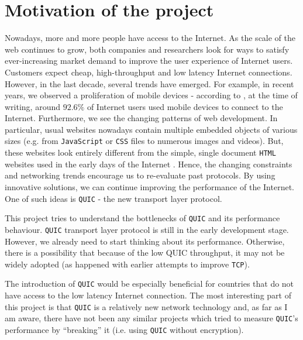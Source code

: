\documentclass[12pt,a4paper,twoside,openright]{report}
\begin{document}
\section{Motivation of the project}
Nowadays, more and more people have access to the Internet.
As the scale of the web continues to grow, both companies and researchers look for ways to satisfy ever-increasing market demand to improve the user experience of Internet users.
Customers expect cheap, high-throughput and low latency Internet connections.
However, in the last decade, several trends have emerged.
For example, in recent years, we observed a proliferation of mobile devices - according to \cite{bib_number_of_mobile_users}, at the time of writing, around $92.6\%$ of Internet users used mobile devices to connect to the Internet.
Furthermore, we see the changing patterns of web development.
In particular, usual websites nowadays contain multiple embedded objects of various sizes (e.g. from \texttt{JavaScript} or \texttt{CSS} files to numerous images and videos)\cite{bib_Netdev_0x13_QUIC_Tutorial}.
But, these websites look entirely different from the simple, single document \texttt{HTML} websites used in the early days of the Internet \cite{RudmanRiaan2016DW3o}.
Hence, the changing constraints and networking trends encourage us to re-evaluate past protocols.
By using innovative solutions, we can continue improving the performance of the Internet. 
One of such ideas is \texttt{QUIC} - the new transport layer protocol.



This project tries to understand the bottlenecks of \texttt{QUIC} and its performance behaviour.
\texttt{QUIC} transport layer protocol is still in the early development stage.
However, we already need to start thinking about its performance.
Otherwise, there is a possibility that because of the low QUIC throughput, it may not be widely adopted (as happened with earlier attempts to improve \texttt{TCP}). 


The introduction of \texttt{QUIC} would be especially beneficial for countries that do not have access to the low latency Internet connection.
The most interesting part of this project is that  \texttt{QUIC} is a relatively new network technology and, as far as I am aware, there have not been any similar projects which tried to measure \texttt{QUIC}’s performance by \enquote{breaking} it (i.e. using \texttt{QUIC} without encryption).
\end{document}
